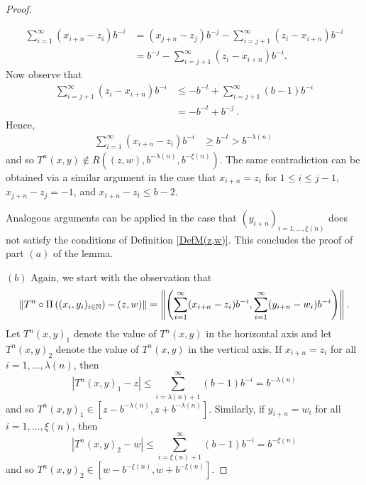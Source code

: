 \documentclass[10pt,a4paper]{amsart}
\newcommand{\N}{{\Bbb N}}         %
\begin{document}
\begin{proof}
\begin{enumerate}[(i)]
\begin{align*}
 \sum_{i=1}^{\infty}(x_{i+n}-z_{i})b^{-i} &= (x_{j+n}-z_{j})b^{-j}-\sum_{i=j+1}^{\infty}(z_{i}-x_{i+n})b^{-i} \\[1ex]
 &= b^{-j}-\sum_{i=j+1}^{\infty}{(z_i-x_{i+n})b^{-i}}.
 \end{align*}
 Now observe that 
 \begin{align*}
     \sum_{i=j+1}^{\infty}{(z_i-x_{i+n})b^{-i}} &\leq -b^{-t}+\sum_{i=j+1}^{\infty}(b-1)b^{-i} \\[1ex] 
     &=-b^{-t}+b^{-j}\, .
 \end{align*}
 Hence,
 \begin{align*}
\sum_{i=1}^{\infty}(x_{i+n}-z_{i})b^{-i}&\geq b^{-t}>b^{-\lambda(n)}\,
 \end{align*} 
and so $T^{n}(x,y) \not \in R\left((z,w), b^{-\lambda(n)}, b^{-\xi(n)} \right)$. The same {contradiction can be obtained via a similar argument} in the case that $x_{i+n}=z_i$ for $1 \leq i \leq j-1$, $x_{j+n}-z_{j}=-1$, and \mbox{$x_{t+n}-z_{t} \leq b-2$}.
\end{enumerate}
Analogous arguments can be applied in the case that $(y_{i+n})_{i=1,\dots,\xi(n)}$ does not satisfy the conditions of Definition \ref{DefM(z,w)}. This concludes the proof of part $(a)$ of the lemma.

\vspace{1ex}
\noindent $(b)$ Again, we start with the observation that
 \begin{equation*}
     \left\|T^{n} \circ \Pi\left((x_{i},y_{i})_{i \in \N}\right)-(z,w)\right\|=\left\|\left(\sum_{i=1}^{\infty}(x_{i+n}-z_{i})b^{-i}, \sum_{i=1}^{\infty}(y_{i+n}-w_{i})b^{-i} \right) \right\|.
 \end{equation*}
Let $T^{n}(x,y)_{1}$ denote the value of $T^{n}(x,y)$ in the horizontal axis and let $T^{n}(x,y)_{2}$ denote the value of $T^{n}(x,y)$ in the vertical axis. If $x_{i+n}=z_{i}$ for all $i=1, \dots , \lambda(n)$, then
 \begin{equation*}
|T^n(x,y)_1-z| \leq \sum_{i=\lambda(n)+1}^{\infty}(b-1)b^{-i}=b^{-\lambda(n)}
 \end{equation*}
 and so $T^{n}(x,y)_{1} \in [z-b^{-\lambda(n)},z+b^{-\lambda(n)}]$. Similarly, if $y_{i+n}=w_{i}$ for all $i=1, \dots , \xi(n)$, then
 \begin{equation*}
|T^n(x,y)_2-w| \leq \sum_{i=\xi(n)+1}^{\infty}(b-1)b^{-i}=b^{-\xi(n)}
 \end{equation*}
 and so $T^{n}(x,y)_{2} \in [w-b^{-\xi(n)},w+b^{-\xi(n)}]$. 
 

\end{proof}
\end{document}
